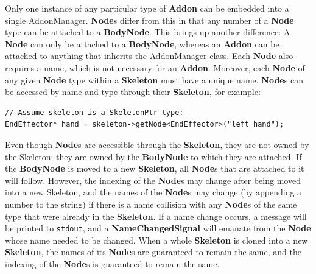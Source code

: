 Only one instance of any particular type of \textbf{Addon} can be embedded into a single AddonManager. \textbf{Node}s differ from this in that any number of a \textbf{Node} type can be attached to a \textbf{BodyNode}. This brings up another difference: A \textbf{Node} can only be attached to a \textbf{BodyNode}, whereas an \textbf{Addon} can be attached to anything that inherits the AddonManager class. Each \textbf{Node} also requires a name, which is not necessary for an \textbf{Addon}. Moreover, each \textbf{Node} of any given \textbf{Node} type within a \textbf{Skeleton} must have a unique name. \textbf{Node}s can be accessed by name and type through their \textbf{Skeleton}, for example:

\begin{lstlisting}
// Assume skeleton is a SkeletonPtr type:
EndEffector* hand = skeleton->getNode<EndEffector>("left_hand");
\end{lstlisting}

Even though \textbf{Node}s are accessible through the \textbf{Skeleton}, they are not owned by the Skeleton; they are owned by the \textbf{BodyNode} to which they are attached. If the \textbf{BodyNode} is moved to a new \textbf{Skeleton}, all \textbf{Node}s that are attached to it will follow. However, the indexing of the \textbf{Node}s may change after being moved into a new Skeleton, and the names of the \textbf{Node}s may change (by appending a number to the string) if there is a name collision with any \textbf{Node}s of the same type that were already in the \textbf{Skeleton}. If a name change occurs, a message will be printed to \texttt{stdout}, and a \textbf{NameChangedSignal} will emanate from the \textbf{Node} whose name needed to be changed. When a whole \textbf{Skeleton} is cloned into a new \textbf{Skeleton}, the names of its \textbf{Node}s are guaranteed to remain the same, and the indexing of the \textbf{Node}s is guaranteed to remain the same.

